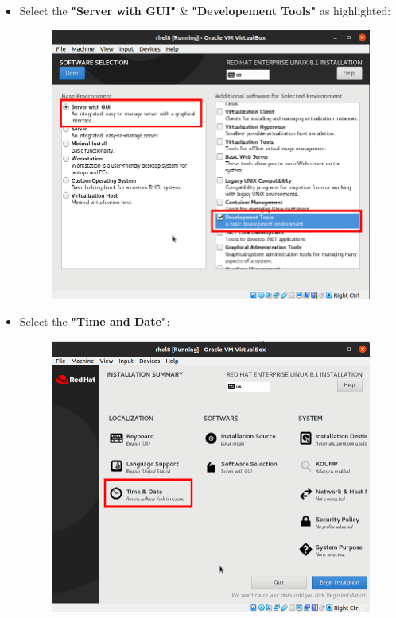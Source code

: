 \begin{flushleft}
\begin{itemize}
	\item Select the \textbf{"Server with GUI"} \& \textbf{"Developement Tools"} as highlighted:
	\begin{figure}[h!]
		\centering
		\includegraphics[scale=.3]{content/chapter18/images/server2.png}
		\caption{}
		\label{primary_swap3}
	\end{figure}		
	\newpage
	\item Select the \textbf{"Time and Date"}:
	\begin{figure}[h!]
		\centering
		\includegraphics[scale=.3]{content/chapter18/images/server3.png}
	\end{figure}		


\end{itemize}
\end{flushleft}
